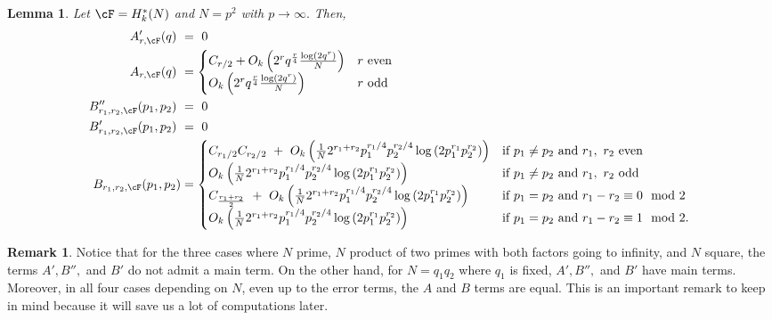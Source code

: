 \documentclass[11pt, reqno]{amsart}
\newtheorem{lemma}[theorem]{Lemma}
\theoremstyle{definition}
\newtheorem{remark}[theorem]{Remark}
\theoremstyle{remark}
\numberwithin{equation}{section}
\begin{document}
\begin{lemma} \label{lem:psquareinfmom}
    Let $\cF=H^*_k(N)$ and $N=p^2$ with $p\to \infty.$ Then,
    \footnotesize
        \begin{align*}
        A'_{r,\cF}(q) \ &= \ 0\\
        A_{r,\cF}(q) \ &=  \begin{cases}
        C_{r/2} + O_k\left(2^rq^\frac{r}{4} \frac{\log(2q^{r})}{N}\right)& r  \ \text{even} \\
       O_k\left(2^rq^\frac{r}{4} \frac{\log(2q^{r})}{N}\right) & r  \ \text{odd}
    \end{cases}\\
        B''_{r_1,r_2,\cF}(p_1,p_2) \ &= \ 0 \\
        B'_{r_1,r_2,\cF}(p_1,p_2) \ &= \ 0 \\
        B_{r_1,r_2,\cF}(p_1,p_2)&= \begin{cases}
            C_{r_1/2}C_{r_2/2} \ + \ O_k\left(\frac{1}{N} 2^{r_1+r_2}{p_1^{r_1/4}p_2^{r_2/4}}\log\left(2p_1^{r_1}p_2^{r_2}\right)\right) & \text{if} \ p_1 \neq p_2 \ \text{and} \ r_1,~r_2  \ \text{even}\\
            O_k\left(\frac{1}{N} 2^{r_1+r_2}{p_1^{r_1/4}p_2^{r_2/4}}\log\left(2p_1^{r_1}p_2^{r_2}\right)\right) & \text{if} \ p_1 \neq p_2 \ \text{and} \ r_1,~r_2  \ \text{odd}\\
            C_{\frac{r_1+r_2}{2}} \ + \ O_k\left(\frac{1}{N} 2^{r_1+r_2}{p_1^{r_1/4}p_2^{r_2/4}}\log\left(2p_1^{r_1}p_2^{r_2}\right)\right) & \text{if} \ p_1 = p_2 \ \text{and} \ r_1-r_2\equiv0 \mod{2}\\
            O_k\left(\frac{1}{N} 2^{r_1+r_2}{p_1^{r_1/4}p_2^{r_2/4}}\log\left(2p_1^{r_1}p_2^{r_2}\right)\right) & \text{if} \ p_1 = p_2 \ \text{and} \ r_1-r_2\equiv1 \mod{2}.\\
        \end{cases}
    \end{align*}
\end{lemma}

\begin{remark}
Notice that for the three cases where $N$ prime, $N$ product of two primes with both factors going to infinity, and $N$ square, the terms $A', B'',$ and $B'$ do not admit a main term. On the other hand, for $N =q_1q_2$ where $q_1$ is fixed, $A', B'',$ and $B'$ have main terms. Moreover, in all four cases depending on $N$, even up to the error terms, the $A$ and $B$ terms are equal. This is an important remark to keep in mind because it will save us a lot of computations later.
\end{remark}
\end{document}
